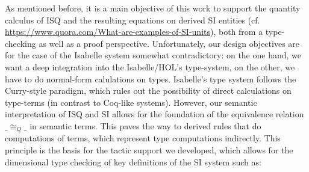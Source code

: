 \documentclass[11pt,a4paper]{book}
\begin{document}
As mentioned before,  it is a main objective of this work to support the quantity calculus of ISQ and the resulting 
equations on derived SI entities (cf. \url{https://www.quora.com/What-are-examples-of-SI-units}),
both from a type-checking as well as a proof perspective.
Unfortunately, our design objectives are for the case of the Isabelle system somewhat contradictory:
on the one hand, we want a deep integration into the Isabelle/HOL's type-system,
on the other, we have to do normal-form calulations on types.
Isabelle's type system follows the Curry-style paradigm, which rules out the possibility
of direct calculations on type-terms (in contrast to Coq-like systems). However, our semantic
interpretation of ISQ and SI allows for the foundation of the equivalence relation $\_\cong_{Q}\_$
in semantic terms. This paves the way to derived rules that do computations of terms, which
represent type computations indirectly. This principle is the basis for the tactic support we 
developed, which allows for the dimensional type checking of key definitions of the SI 
system such as:
\end{document}
